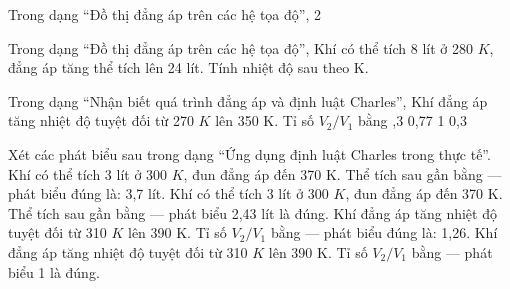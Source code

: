 \begin{ex}
Trong dạng “Đồ thị đẳng áp trên các hệ tọa độ”, 2
\choiceTF

\end{ex}

\begin{ex}
Trong dạng “Đồ thị đẳng áp trên các hệ tọa độ”, Khí có thể tích 8 lít ở 280 $K$, đẳng áp tăng thể tích lên 24 lít. Tính nhiệt độ sau theo K.
\end{ex}

\begin{ex}
Trong dạng “Nhận biết quá trình đẳng áp và định luật Charles”, Khí đẳng áp tăng nhiệt độ tuyệt đối từ 270 $K$ lên 350 K. Tỉ số $V_2/V_1$ bằng
\choice
{,3}
{0,77}
{1}
{0,3}
\end{ex}

\begin{ex}
Xét các phát biểu sau trong dạng “Ứng dụng định luật Charles trong thực tế”.
\choiceTF
{\True Khí có thể tích 3 lít ở 300 $K$, đun đẳng áp đến 370 K. Thể tích sau gần bằng — phát biểu đúng là: 3,7 lít.}
{Khí có thể tích 3 lít ở 300 $K$, đun đẳng áp đến 370 K. Thể tích sau gần bằng — phát biểu 2,43 lít là đúng.}
{\True Khí đẳng áp tăng nhiệt độ tuyệt đối từ 310 $K$ lên 390 K. Tỉ số $V_2/V_1$ bằng — phát biểu đúng là: 1,26.}
{Khí đẳng áp tăng nhiệt độ tuyệt đối từ 310 $K$ lên 390 K. Tỉ số $V_2/V_1$ bằng — phát biểu 1 là đúng.}
\end{ex}

